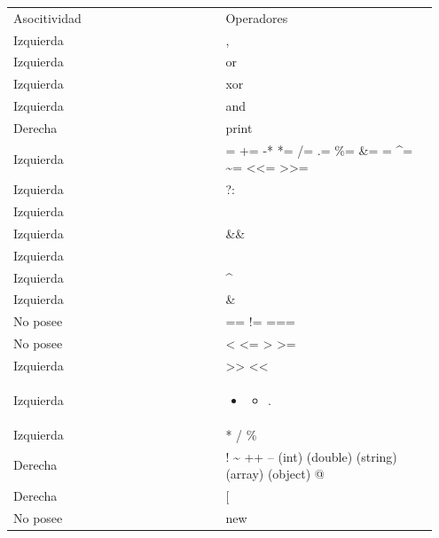 \documentclass[a5paper,10pt,spanish]{sphinxmanual}
\begin{document}
\begin{tabular}{|p{0.475\linewidth}|p{0.475\linewidth}|}
\hline

Asocitividad
 & 
Operadores
\\

Izquierda
 & 
,
\\

Izquierda
 & 
or
\\

Izquierda
 & 
xor
\\

Izquierda
 & 
and
\\

Derecha
 & 
print
\\

Izquierda
 & 
= += -* *= /= .= \%= \&= \textbar{}= \textasciicircum{}= \textasciitilde{}= \textless{}\textless{}= \textgreater{}\textgreater{}=
\\

Izquierda
 & 
?:
\\

Izquierda
 & 
\textbar{}\textbar{}
\\

Izquierda
 & 
\&\&
\\

Izquierda
 & 
\textbar{}
\\

Izquierda
 & 
\textasciicircum{}
\\

Izquierda
 & 
\&
\\

No posee
 & 
== != ===
\\

No posee
 & 
\textless{} \textless{}= \textgreater{} \textgreater{}=
\\

Izquierda
 & 
\textgreater{}\textgreater{} \textless{}\textless{}
\\

Izquierda
 & \begin{itemize}
\item {} \begin{itemize}
\item {} 
.

\end{itemize}

\end{itemize}
\\

Izquierda
 & 
* / \%
\\

Derecha
 & 
! \textasciitilde{} ++ -- (int) (double) (string) (array) (object) @
\\

Derecha
 & 
{[}
\\

No posee
 & 
new
\\
\hline\end{tabular}
\end{document}
